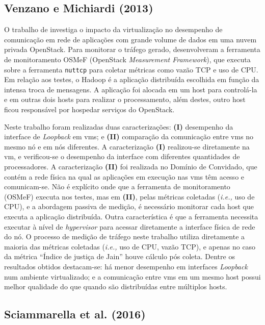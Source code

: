 \subsection{Venzano e Michiardi (2013)}

O trabalho de  investiga o impacto da virtualização no desempenho de comunicação em rede de aplicações com grande volume de dados em uma nuvem privada OpenStack.
%
Para monitorar o tráfego gerado, desenvolveram a ferramenta de monitoramento OSMeF (OpenStack \textit{Measurement Framework}), que executa sobre a ferramenta \texttt{nuttcp} para coletar métricas como vazão TCP e uso de CPU.
%
Em relação aos testes, o Hadoop é a aplicação distribuída escolhida em função da intensa troca de mensagens.
%
A aplicação foi alocada em um host para controlá-la e em outras dois hosts para realizar o processamento, além destes, outro host ficou responsável por hospedar serviços do OpenStack.

Neste trabalho foram realizadas duas caracterizações: \textbf{(I)} desempenho da interface de \textit{Loopback} em \acp{vm}; e \textbf{(II)} comparação da comunicação entre \acp{vm} no mesmo nó e em nós diferentes.
%
A caracterização \textbf{(I)} realizou-se diretamente na \ac{vm}, e verificou-se o desempenho da interface com diferentes quantidades de processadores.
%
A caracterização \textbf{(II)} foi realizada no Domínio de Convidado, que contém a rede física na qual as aplicações em execução nas \acp{vm} têm acesso e comunicam-se.
%
Não é explícito onde que a ferramenta de monitoramento (OSMeF) executa nos testes, mas em \textbf{(II)}, pelas métricas coletadas (\textit{i.e.,} uso de CPU), e a abordagem passiva de medição, é necessário monitorar cada host que executa a aplicação distribuída.
%
Outra característica é que a ferramenta necessita executar à nível de \textit{hypervisor} para acessar diretamente a interface física de rede do nó.
%
O processo de medição de tráfego neste trabalho utiliza diretamente a maioria das métricas coletadas (\textit{i.e.,} uso de CPU, vazão TCP), e apenas no caso da métrica ``Índice de justiça de Jain'' \cite{jain:1984:fairnessIndex} houve cálculo pós coleta.
%
Dentre os resultados obtidos destacam-se: há menor desempenho em interfaces \textit{Loopback} num ambiente virtualizado; e a comunicação entre \acp{vm} em um mesmo host possui melhor qualidade do que quando são distribuídas entre múltiplos hosts.


\subsection{Sciammarella et al. (2016)}

